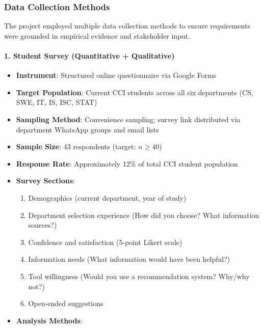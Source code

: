 \documentclass[12pt, a4paper]{article}
\begin{document}
\subsubsection{Data Collection Methods}

The project employed multiple data collection methods to ensure requirements were grounded in empirical evidence and stakeholder input.

\paragraph{1. Student Survey (Quantitative + Qualitative)}

\begin{itemize}[leftmargin=1.5em, itemsep=3pt]
    \item \textbf{Instrument}: Structured online questionnaire via Google Forms
    \item \textbf{Target Population}: Current CCI students across all six departments (CS, SWE, IT, IS, ISC, STAT)
    \item \textbf{Sampling Method}: Convenience sampling; survey link distributed via department WhatsApp groups and email lists
    \item \textbf{Sample Size}: 43 respondents (target: $n \geq 40$)
    \item \textbf{Response Rate}: Approximately 12\% of total CCI student population
    \item \textbf{Survey Sections}:
    \begin{enumerate}[leftmargin=1.5em, itemsep=2pt]
        \item Demographics (current department, year of study)
        \item Department selection experience (How did you choose? What information sources?)
        \item Confidence and satisfaction (5-point Likert scale)
        \item Information needs (What information would have been helpful?)
        \item Tool willingness (Would you use a recommendation system? Why/why not?)
        \item Open-ended suggestions
    \end{enumerate}
    \item \textbf{Analysis Methods}:
    \begin{itemize}[leftmargin=1.5em, itemsep=2pt]

\end{itemize}
\end{itemize}
\end{document}
